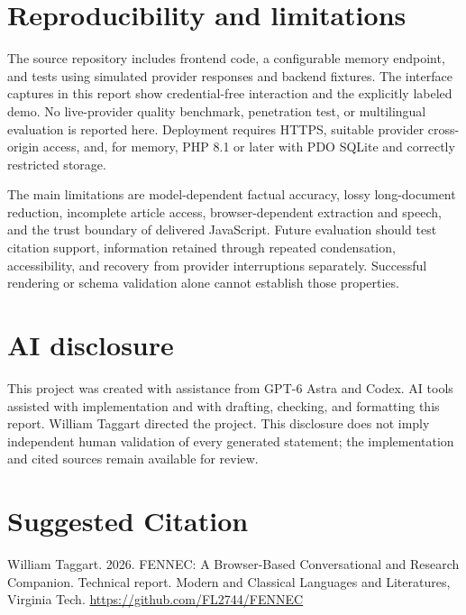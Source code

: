 \documentclass[manuscript,screen,nonacm]{acmart}
\begin{document}
\section{Reproducibility and limitations}

The source repository includes frontend code, a configurable memory endpoint, and tests using simulated provider responses and backend fixtures. The interface captures in this report show credential-free interaction and the explicitly labeled demo. No live-provider quality benchmark, penetration test, or multilingual evaluation is reported here. Deployment requires HTTPS, suitable provider cross-origin access, and, for memory, PHP 8.1 or later with PDO SQLite and correctly restricted storage.

The main limitations are model-dependent factual accuracy, lossy long-document reduction, incomplete article access, browser-dependent extraction and speech, and the trust boundary of delivered JavaScript. Future evaluation should test citation support, information retained through repeated condensation, accessibility, and recovery from provider interruptions separately. Successful rendering or schema validation alone cannot establish those properties.

\FloatBarrier
\section{AI disclosure}

This project was created with assistance from GPT-6 Astra and Codex. AI tools assisted with implementation and with drafting, checking, and formatting this report. William Taggart directed the project. This disclosure does not imply independent human validation of every generated statement; the implementation and cited sources remain available for review.




\section*{Suggested Citation}
William Taggart. 2026. FENNEC: A Browser-Based Conversational and Research Companion. Technical report. Modern and Classical Languages and Literatures, Virginia Tech.
\url{https://github.com/FL2744/FENNEC}
\end{document}
